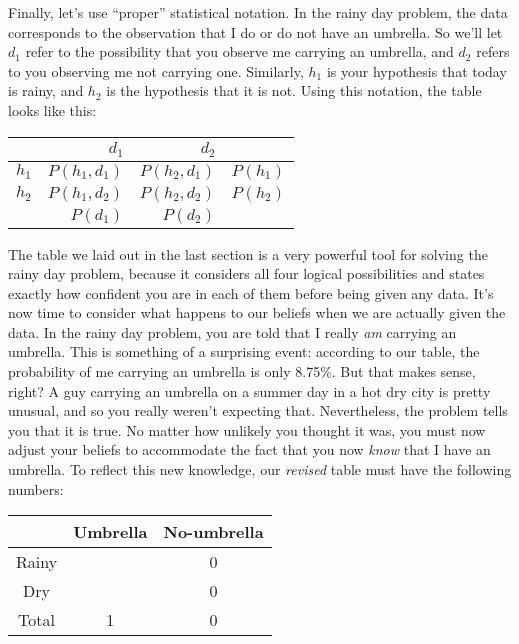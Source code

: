 \noindent
Finally, let's use ``proper'' statistical notation. In the rainy day problem, the data corresponds to the observation that I do or do not have an umbrella. So we'll let $d_1$ refer to the possibility that you observe me carrying an umbrella, and $d_2$ refers to you observing me not carrying one. Similarly, $h_1$ is your hypothesis that today is rainy, and $h_2$ is the hypothesis that it is not. Using this notation, the table looks like this:

 \begin{center}
\begin{tabular}{r|rr|r}
& $d_1$ & $d_2$ &  \\[6pt] \hline
$h_1$ & $P(h_1, d_1)$ & $P(h_2, d_1)$ & $P(h_1)$ \\[6pt]
$h_2$ & $P(h_1, d_2)$ & $P(h_2, d_2)$ & $P(h_2)$ \\[6pt] \hline
 & $P(d_1)$ & $P(d_2)$ & 
\end{tabular}
\end{center}




The table we laid out in the last section is a very powerful tool for solving the rainy day problem, because it considers all four logical possibilities and states exactly how confident you are in each of them before being given any data. It's now time to consider what happens to our beliefs when we are actually given the data. In the rainy day problem, you are told that I really {\it am} carrying an umbrella. This is something of a surprising event: according to our table, the probability of me carrying an umbrella is only 8.75\%. But that makes sense, right? A guy carrying an umbrella on a summer day in a hot dry city is pretty unusual, and so you really weren't expecting that. Nevertheless, the problem tells you that it is true. No matter how unlikely you thought it was, you must now adjust your beliefs to accommodate the fact that you now {\it know} that I have an umbrella. To reflect this new knowledge, our {\it revised} table must have the following numbers:

\begin{center}
\begin{tabular}{c|cc}
& Umbrella & No-umbrella  \\ \hline
Rainy &  & 0   \\
Dry &  & 0    \\ \hline
Total & 1 & 0 
\end{tabular}
\end{center}

